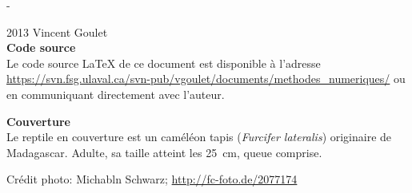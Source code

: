 \begingroup
\calccentering{\unitlength}
\begin{adjustwidth*}{\unitlength}{-\unitlength}
  \setlength{\parindent}{0pt}
  \setlength{\parskip}{\baselineskip}

  {\textcopyright} 2013 Vincent Goulet \\

  

  \textbf{Code source} \\
  Le code source {\LaTeX} de ce document est disponible à l'adresse
    \url{https://svn.fsg.ulaval.ca/svn-pub/vgoulet/documents/methodes_numeriques/}
  ou en communiquant directement avec l'auteur.

  \textbf{Couverture} \\
  Le reptile en couverture est un caméléon tapis (\emph{Furcifer
    lateralis}) originaire de Madagascar. Adulte, sa taille atteint
  les 25~cm, queue comprise.

  Crédit photo: Michabln Schwarz; \url{http://fc-foto.de/2077174}
\end{adjustwidth*}
\endgroup

